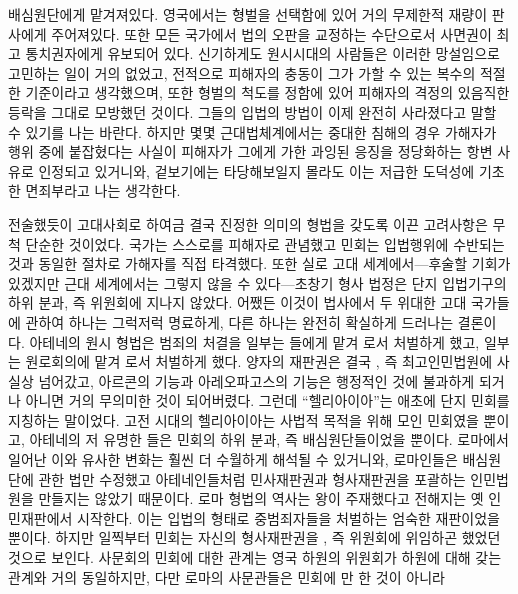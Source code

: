 배심원단에게 맡겨져있다.
영국에서는
형벌을 선택함에 있어 거의 무제한적 재량이
판사에게 주어져있다.
또한 모든 국가에서
법의 오판을 교정하는 수단으로서
사면권이 최고 통치권자에게 유보되어 있다.
신기하게도
원시시대의 사람들은 이러한 망설임으로 고민하는 일이 거의 없었고,
전적으로
피해자의 충동이 그가 가할 수 있는 복수의 적절한 기준이라고 생각했으며,
또한 형벌의 척도를 정함에 있어
피해자의 격정의 있음직한 등락을 그대로 모방했던 것이다.
그들의 입법의 방법이 이제 완전히 사라졌다고 말할 수 있기를 나는 바란다.
하지만 몇몇 근대법체계에서는
중대한 침해의 경우
가해자가 행위 중에 붙잡혔다는 사실이
피해자가 그에게 가한 과잉된 응징을
정당화하는 항변 사유로 인정되고 있거니와,
겉보기에는 타당해보일지 몰라도
이는
저급한 도덕성에 기초한 면죄부라고 나는 생각한다.

전술했듯이
고대사회로 하여금 결국 진정한 의미의 형법을 갖도록 이끈
고려사항은 무척 단순한 것이었다.
국가는 스스로를 피해자로 관념했고
민회는 입법행위에 수반되는 것과 동일한 절차로
가해자를 직접 타격했다.
또한 실로 고대 세계에서---후술할 기회가 있겠지만
근대 세계에서는 그렇지 않을 수 있다---초창기 형사 법정은
단지 입법기구의 하위 분과, 즉 위원회에 지나지 않았다.
어쨌든 이것이
법사에서 두 위대한 고대 국가들에 관하여
하나는 그럭저럭 명료하게, 다른 하나는 완전히 확실하게
드러나는 결론이다.
아테네의 원시 형법은 범죄의 처결을
일부는 들에게 맡겨
로서 처벌하게 했고,
일부는  원로회의에 맡겨
로서 처벌하게 했다.
양자의 재판권은 결국 , 즉
최고인민법원에 사실상 넘어갔고,
아르콘의 기능과 아레오파고스의 기능은 행정적인 것에 불과하게 되거나
아니면 거의 무의미한 것이 되어버렸다.
그런데 ``헬리아이아''는 애초에 단지 민회를 지칭하는 말이었다.
고전 시대의 헬리아이아는 사법적 목적을 위해
모인 민회였을 뿐이고,
아테네의 저 유명한 들은
민회의 하위 분과, 즉 배심원단들이었을 뿐이다.
로마에서 일어난 이와 유사한 변화는
훨씬 더 수월하게 해석될 수 있거니와,
로마인들은 배심원단에 관한 법만 수정했고
아테네인들처럼 민사재판권과 형사재판권을 포괄하는 인민법원을
만들지는 않았기 때문이다.
로마 형법의 역사는
왕이 주재했다고 전해지는
옛 인민재판에서 시작한다.
이는 입법의 형태로 중범죄자들을 처벌하는 엄숙한 재판이었을 뿐이다.
하지만
일찍부터
민회는 자신의 형사재판권을
, 즉 위원회에
위임하곤 했었던 것으로 보인다.
사문회의 민회에 대한 관계는
영국 하원의 위원회가 하원에 대해 갖는 관계와 거의 동일하지만,
다만 로마의 사문관들은
민회에 만 한 것이 아니라
